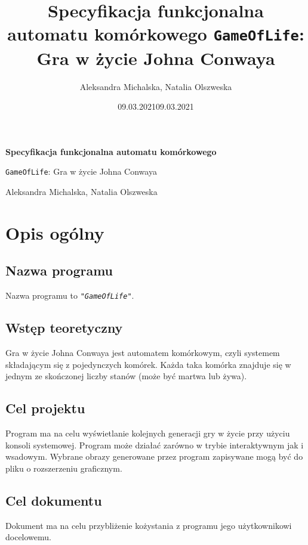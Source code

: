 \documentclass{article}
\title{Specyfikacja funkcjonalna automatu kom\'orkowego \texttt{GameOfLife}:
	Gra w \.zycie Johna Conwaya}
\author{Aleksandra Michalska, Natalia Olszweska}
\date{09.03.2021}
\begin{document}
\begin{titlepage}
	\begin{center}
		\vspace*{5cm}

	        \Huge
        	\textbf{Specyfikacja funkcjonalna automatu kom\'orkowego}

        	\vspace{1cm}
	        \Huge
        	\texttt{GameOfLife}: Gra w \.zycie Johna Conwaya

    		\vspace{1.5cm}

	        \large
		Aleksandra Michalska, Natalia Olszweska

        	\vfill

	        \vspace{0.8cm}


		\Large \date{09.03.2021}
	\end{center}
\end{titlepage}



\section{Opis og\'olny}
\subsection{Nazwa programu}
\quad Nazwa programu to \texttt{\textit{"GameOfLife"}}.
\subsection{Wst\k{e}p teoretyczny}
\quad Gra w \.zycie Johna Conwaya jest automatem kom\'orkowym, czyli systemem sk\l{}adaj\k{a}cym si\k{e} z pojedynczych kom\'orek. Ka\.zda taka kom\'orka znajduje si\k{e} w jednym ze sko\'nczonej liczby stan\'ow (mo\.ze by\'c martwa lub \.zywa). 
\subsection{Cel projektu}
\quad Program ma na celu wy\'swietlanie kolejnych generacji gry w \.zycie przy u\.zyciu konsoli systemowej. Program mo\.ze dzia\l{}a\'c zar\'owno w trybie interaktywnym jak i wsadowym. Wybrane obrazy generowane przez program zapisywane mog\k{a} by\'c do pliku o rozszerzeniu graficznym.
\subsection{Cel dokumentu}
\quad Dokument ma na celu przybli\.zenie ko\.zystania z programu jego u\.zytkownikowi docelowemu.
\end{document}
